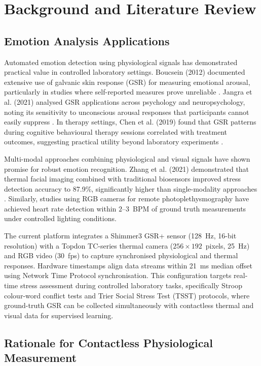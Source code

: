 \documentclass{report}
\begin{document}
\chapter{Background and Literature Review}
\label{ch:background}


\section{Emotion Analysis Applications}
\label{sec:emotion_apps}

Automated emotion detection using physiological signals has demonstrated practical value in controlled laboratory settings. Boucsein (2012) documented extensive use of galvanic skin response (GSR) for measuring emotional arousal, particularly in studies where self-reported measures prove unreliable \cite{boucsein2012}. Jangra et al. (2021) analysed GSR applications across psychology and neuropsychology, noting its sensitivity to unconscious arousal responses that participants cannot easily suppress \cite{jangra2021}. In therapy settings, Chen et al. (2019) found that GSR patterns during cognitive behavioural therapy sessions correlated with treatment outcomes, suggesting practical utility beyond laboratory experiments \cite{chen2019}.

Multi-modal approaches combining physiological and visual signals have shown promise for robust emotion recognition. Zhang et al. (2021) demonstrated that thermal facial imaging combined with traditional biosensors improved stress detection accuracy to 87.9\%, significantly higher than single-modality approaches \cite{zhang2021}. Similarly, studies using RGB cameras for remote photoplethysmography have achieved heart rate detection within $2$--$3$~BPM of ground truth measurements under controlled lighting conditions.

The current platform integrates a Shimmer3 GSR+ sensor (128~Hz, 16-bit resolution) with a Topdon TC-series thermal camera ($256 \times 192$~pixels, 25~Hz) and RGB video (30~fps) to capture synchronised physiological and thermal responses. Hardware timestamps align data streams within 21~ms median offset using Network Time Protocol synchronisation. This configuration targets real-time stress assessment during controlled laboratory tasks, specifically Stroop colour-word conflict tests and Trier Social Stress Test (TSST) protocols, where ground-truth GSR can be collected simultaneously with contactless thermal and visual data for supervised learning.


\section{Rationale for Contactless Physiological Measurement}
\label{sec:rationale_contactless}
\end{document}
